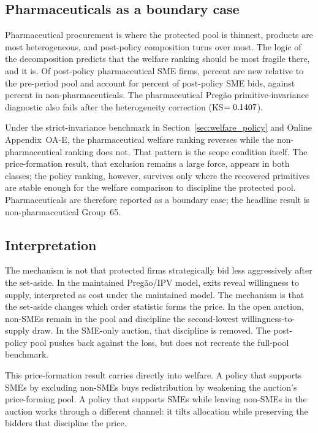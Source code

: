 \subsection{Pharmaceuticals as a boundary case}\label{sec:pharma_scope}

Pharmaceutical procurement is where the protected pool is thinnest,
products are most heterogeneous, and post-policy composition turns over
most. The logic of the decomposition predicts that the welfare
ranking should be most fragile there, and it is. Of post-policy
pharmaceutical SME firms, \turnoverPhPctNewFirms{} percent are new relative
to the pre-period pool and account for \turnoverPhPctNewBids{} percent of
post-policy SME bids, against \turnoverNpPctNewBids{} percent in
non-pharmaceuticals. The pharmaceutical Preg\~ao primitive-invariance
diagnostic also fails after the heterogeneity correction
(KS$=0.1407$).

Under the strict-invariance benchmark in Section~\ref{sec:welfare_policy}
and Online Appendix~OA-E, the pharmaceutical welfare ranking reverses while
the non-pharmaceutical ranking does not. That pattern is the scope
condition itself. The price-formation result, that exclusion remains a
large force, appears in both classes; the policy ranking, however,
survives only where the recovered primitives are stable enough for the
welfare comparison to discipline the protected pool. Pharmaceuticals are therefore reported
as a boundary case; the headline result is non-pharmaceutical Group~65.

\subsection{Interpretation}

The mechanism is not that protected firms strategically bid less aggressively
after the set-aside. In the maintained Preg\~ao/IPV model, exits reveal
willingness to supply, interpreted as cost under the maintained model. The
mechanism is that the set-aside changes which order statistic forms the
price. In the open auction, non-SMEs remain in the pool and discipline the
second-lowest willingness-to-supply draw. In the SME-only auction, that
discipline is removed. The post-policy pool pushes back against
the loss, but does not recreate the full-pool benchmark.

This price-formation result carries directly into welfare. A policy that
supports SMEs by excluding non-SMEs buys redistribution by weakening the
auction's price-forming pool. A policy that supports SMEs while leaving
non-SMEs in the auction works through a different channel: it tilts
allocation while preserving the bidders that discipline the price.
